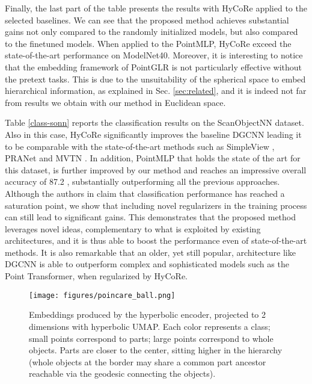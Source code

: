 \documentclass{article}
\begin{document}
Finally, the last part of the table presents the results with HyCoRe applied to the selected baselines. We can see that the proposed method achieves substantial gains not only compared to the randomly initialized models, but also compared to the finetuned models. When applied to the PointMLP, HyCoRe exceed the state-of-the-art performance on ModelNet40. Moreover, it is interesting to notice that the embedding framework of PointGLR is not particularly effective without the pretext tasks. This is due to the unsuitability of the spherical space to embed hierarchical information, as explained in Sec. \ref{sec:related}, and it is indeed not far from results we obtain with our method in Euclidean space.

Table \ref{class-sonn} reports the classification results on the ScanObjectNN dataset. Also in this case, HyCoRe significantly improves the baseline DGCNN leading it to be comparable with the state-of-the-art methods such as SimpleView \cite{goyal2021revisiting}, PRANet \cite{cheng2021net} and MVTN \cite{hamdi2021mvtn}. 
In addition, PointMLP that holds the state of the art for this dataset, is further improved by our method and reaches an impressive overall accuracy of 87.2 , substantially outperforming all the previous approaches. Although the authors in \cite{ma2022rethinking} claim that classification performance has reached a saturation point, we show that including novel regularizers in the training process can still lead to significant gains. This demonstrates that the proposed method leverages novel ideas, complementary to what is exploited by existing architectures, and it is thus able to boost the performance even of state-of-the-art methods. It is also remarkable that an older, yet still popular, architecture like DGCNN is able to outperform complex and sophisticated models such as the Point Transformer, when regularized by HyCoRe.


\begin{figure}
  \centering
    \texttt{[image: figures/poincare\_ball.png]}
\caption{Embeddings produced by the hyperbolic encoder, projected to 2 dimensions with hyperbolic UMAP. Each color represents a class; small points correspond to parts; large points correspond to whole objects. Parts are closer to the center, sitting higher in the hierarchy (whole objects at the border may share a common part ancestor reachable via the geodesic connecting the objects).}
  \label{fig:feat-emb}
\end{figure}
\end{document}
